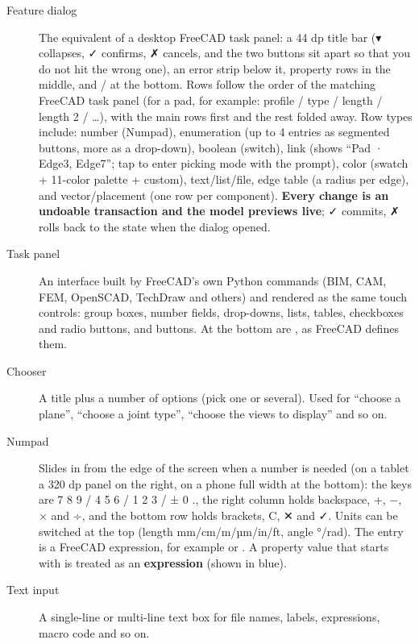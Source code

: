 \begin{description}
  \item[Feature dialog] The equivalent of a desktop FreeCAD task panel: a 44 dp title bar (▾ collapses, ✓
        confirms, ✗ cancels, and the two buttons sit apart so that you do not hit the wrong one), an error strip
        below it, property rows in the middle, and / at the bottom. Rows
        follow the order of the matching FreeCAD task panel (for a pad, for example: profile / type / length /
        length 2 / …), with the main rows first and the rest folded away. Row types include: number (Numpad),
        enumeration (up to 4 entries as segmented buttons, more as a drop-down), boolean (switch), link (shows
        “Pad · Edge3, Edge7”; tap to enter picking mode with the  prompt), color (swatch +
        11-color palette + custom), text/list/file, edge table (a radius per edge), and vector/placement (one
        row per component). \textbf{Every change is an undoable transaction and the model previews live}; ✓
        commits, ✗ rolls back to the state when the dialog opened.
  \item[Task panel] An interface built by FreeCAD's own Python commands (BIM, CAM, FEM, OpenSCAD, TechDraw and
        others) and rendered as the same touch controls: group boxes, number fields, drop-downs, lists, tables,
        checkboxes and radio buttons, and buttons. At the bottom are , as FreeCAD
        defines them.
  \item[Chooser] A title plus a number of options (pick one or several). Used for “choose a plane”, “choose a
        joint type”, “choose the views to display” and so on.
  \item[Numpad] Slides in from the edge of the screen when a number is needed (on a tablet a 320 dp panel on
        the right, on a phone full width at the bottom): the keys are 7 8 9 / 4 5 6 / 1 2 3 / ± 0 ., the right
        column holds backspace, +, −, × and ÷, and the bottom row holds brackets, C, ✕ and ✓. Units can be
        switched at the top (length mm/cm/m/µm/in/ft, angle °/rad). The entry is a FreeCAD expression, for
        example \file{25 mm} or . A property value that starts with \file{=} is treated
        as an \textbf{expression} (shown in blue).
  \item[Text input] A single-line or multi-line text box for file names, labels, expressions, macro code and so
        on.
\end{description}

